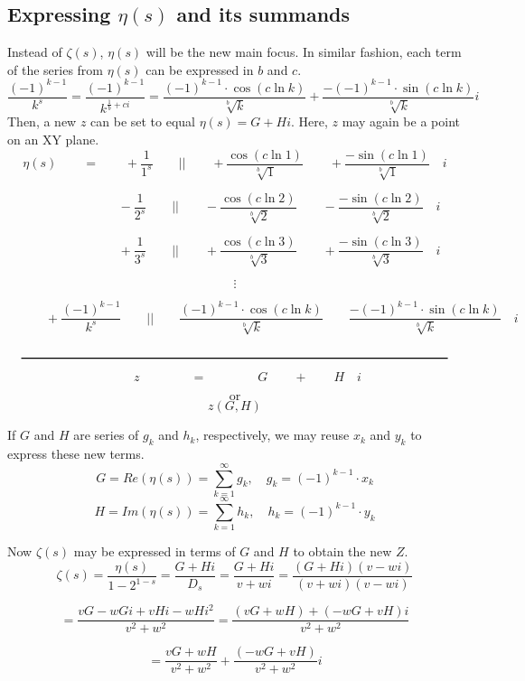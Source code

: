 \documentclass{amsart}
\begin{document}
	\subsection{Expressing $\eta(s)$ and its summands}
	Instead of $\zeta(s)$, $\eta(s)$ will be the new main focus. In similar fashion, each term of the series from $\eta(s)$ can be expressed in $b$ and $c$.
	\[ \frac{(-1)^{k-1}}{k^s} = \frac{(-1)^{k-1}}{k^{\frac{1}{b} + ci}} = \frac{(-1)^{k-1} \cdot \cos({c\ln k})}{\sqrt[b]{k}} + \frac{-(-1)^{k-1} \cdot \sin({c\ln k})}{\sqrt[b]{k}} i \]
	Then, a new $z$ can be set to equal $\eta(s) = G + Hi$. Here, $z$ may again be a point on an XY plane.
	\[ \eta(s) \qquad = \qquad +\frac{1}{1^s} \qquad \Big|\Big|  \qquad +\frac{\cos({c\ln 1})}{\sqrt[b]{1}} \qquad +\frac{-\sin({c\ln 1})}{\sqrt[b]{1}} \quad i  \]
	
	\[ \quad \qquad  \qquad \qquad -\frac{1}{2^s} \qquad \Big|\Big|  \qquad -\frac{\cos({c\ln 2})}{\sqrt[b]{2}} \qquad -\frac{-\sin({c\ln 2})}{\sqrt[b]{2}} \quad i  \]
	
	\[ \quad \qquad  \qquad \qquad +\frac{1}{3^s} \qquad \Big|\Big|  \qquad +\frac{\cos({c\ln 3})}{\sqrt[b]{3}} \qquad +\frac{-\sin({c\ln 3})}{\sqrt[b]{3}} \quad i  \]
	
	\[ \vdots \]
	
	\[ \qquad  \quad +\frac{(-1)^{k-1}}{k^s} \qquad \Big|\Big|  \qquad \frac{(-1)^{k-1} \cdot \cos({c\ln k})}{\sqrt[b]{k}} \qquad \frac{{-}(-1)^{k-1} \cdot \sin({c\ln k})}{\sqrt[b]{k}} \quad i  \]
	
	\[\quad \rule{12 cm}{.8pt} \quad \]
	\[ \qquad \qquad \qquad z \qquad\qquad =  \qquad\qquad G \qquad + \qquad H \quad i \qquad\qquad \]
	
	\[ \text{or} \]
	\[ z (G, H) \]
	\[\]
	
	If $G$ and $H$ are series of $g_k$ and $h_k$, respectively, we may reuse $x_k$ and $y_k$ to express these new terms.
	\[ G = Re(\eta(s)) = \sum\limits_{k=1}^{\infty}g_{k}, \quad g_k = (-1)^{k-1} \cdot x_k \]
	\[ H = Im(\eta(s)) = \sum\limits_{k=1}^{\infty}h_{k}, \quad h_k = (-1)^{k-1} \cdot y_k \]
	
	Now $\zeta(s)$ may be expressed in terms of $G$ and $H$ to obtain the new $Z$.
	\[ \zeta(s) = \frac{\eta(s)}{1-2^{1-s}} = \frac{G + Hi}{D_{s}} = \frac{G+Hi}{v+wi} = \frac{(G+Hi)(v-wi)}{(v+wi)(v-wi)} \]
	
	\[ = \frac{vG-wGi+vHi-wHi^2}{v^2+w^2} = \frac{(vG+wH)+(-wG+vH)i}{v^2+w^2} \]
	
	\[ = \frac{vG+wH}{v^2+w^2} + \frac{(-wG+vH)}{v^2+w^2}i \]
	
\end{document}
